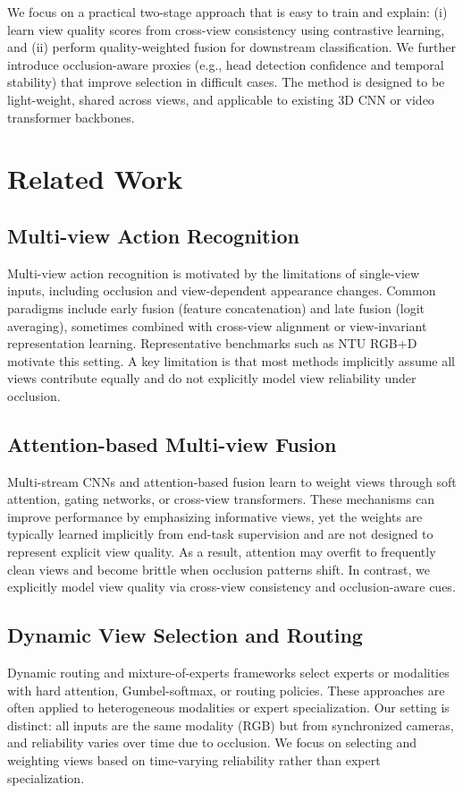 \documentclass[runningheads]{llncs}
\begin{document}
We focus on a practical two-stage approach that is easy to train and explain: (i) learn view quality scores from cross-view consistency using contrastive learning, and (ii) perform quality-weighted fusion for downstream classification. We further introduce occlusion-aware proxies (e.g., head detection confidence and temporal stability) that improve selection in difficult cases. The method is designed to be light-weight, shared across views, and applicable to existing 3D CNN or video transformer backbones.


\section{Related Work}
\label{sec:related}

\subsection{Multi-view Action Recognition}
Multi-view action recognition is motivated by the limitations of single-view inputs, including occlusion and view-dependent appearance changes. Common paradigms include early fusion (feature concatenation) and late fusion (logit averaging), sometimes combined with cross-view alignment or view-invariant representation learning. Representative benchmarks such as NTU RGB+D motivate this setting. A key limitation is that most methods implicitly assume all views contribute equally and do not explicitly model view reliability under occlusion.

\subsection{Attention-based Multi-view Fusion}
Multi-stream CNNs and attention-based fusion learn to weight views through soft attention, gating networks, or cross-view transformers. These mechanisms can improve performance by emphasizing informative views, yet the weights are typically learned implicitly from end-task supervision and are not designed to represent explicit view quality. As a result, attention may overfit to frequently clean views and become brittle when occlusion patterns shift. In contrast, we explicitly model view quality via cross-view consistency and occlusion-aware cues.

\subsection{Dynamic View Selection and Routing}
Dynamic routing and mixture-of-experts frameworks select experts or modalities with hard attention, Gumbel-softmax, or routing policies. These approaches are often applied to heterogeneous modalities or expert specialization. Our setting is distinct: all inputs are the same modality (RGB) but from synchronized cameras, and reliability varies over time due to occlusion. We focus on selecting and weighting views based on time-varying reliability rather than expert specialization.
\end{document}
